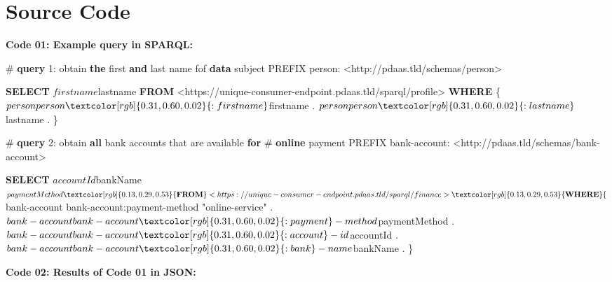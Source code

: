 \documentclass[12pt,english,a4paper,titlepage,cleardoublepage=empty,dottedtoc]{report}
\newenvironment{Shaded}{\begin{snugshade}}{\end{snugshade}}
\newcommand{\KeywordTok}[1]{\textcolor[rgb]{0.13,0.29,0.53}{\textbf{#1}}}
\newcommand{\DecValTok}[1]{\textcolor[rgb]{0.00,0.00,0.81}{#1}}
\newcommand{\CharTok}[1]{\textcolor[rgb]{0.31,0.60,0.02}{#1}}
\newcommand{\OtherTok}[1]{\textcolor[rgb]{0.56,0.35,0.01}{#1}}
\newcommand{\FunctionTok}[1]{\textcolor[rgb]{0.00,0.00,0.00}{#1}}
\newcommand{\NormalTok}[1]{#1}
\begin{document}
\chapter*{Source Code}\label{source-code}

 \setcounter{page}{6} \pagestyle{plain}

\textbf{\protect\hypertarget{code-01_sparql-query}{}{Code 01: Example
query in SPARQL}:}

\begin{Shaded}
\begin{Highlighting}[numbers=left,,]
\NormalTok{# }\KeywordTok{query} \DecValTok{1}\NormalTok{: obtain }\KeywordTok{the} \FunctionTok{first} \KeywordTok{and} \FunctionTok{last}\NormalTok{ name fof }\KeywordTok{data}\NormalTok{ subject}
\NormalTok{PREFIX person: <http://pdaas.tld/schemas/person>}

\KeywordTok{SELECT}\NormalTok{ $firstname $lastname}
\KeywordTok{FROM}\NormalTok{ <https://unique-consumer-endpoint.pdaas.tld/sparql/profile>}
\KeywordTok{WHERE}\NormalTok{ \{}
\NormalTok{    $person person}\CharTok{:firstname}\NormalTok{ $firstname .}
\NormalTok{    $person person}\CharTok{:lastname}\NormalTok{ $lastname .}
\NormalTok{\}}


\NormalTok{# }\KeywordTok{query} \DecValTok{2}\NormalTok{: obtain }\KeywordTok{all}\NormalTok{ bank accounts that are available }\KeywordTok{for} 
\NormalTok{# }\KeywordTok{online}\NormalTok{ payment}
\NormalTok{PREFIX bank-account: <http://pdaas.tld/schemas/bank-account>}

\KeywordTok{SELECT}\NormalTok{ $accountId $bankName $paymentMethod}
\KeywordTok{FROM}\NormalTok{ <https://unique-consumer-endpoint.pdaas.tld/sparql/finance>}
\KeywordTok{WHERE}\NormalTok{ \{}
\NormalTok{    $bank-account bank-account}\CharTok{:payment}\NormalTok{-method }\OtherTok{"online-service"}\NormalTok{ .}
\NormalTok{    $bank-account bank-account}\CharTok{:payment}\NormalTok{-method $paymentMethod .}
\NormalTok{    $bank-account bank-account}\CharTok{:account}\NormalTok{-id $accountId . }
\NormalTok{    $bank-account bank-account}\CharTok{:bank}\NormalTok{-name $bankName .}
\NormalTok{\}}
\end{Highlighting}
\end{Shaded}

\newpage

\textbf{\protect\hypertarget{code-02_sparql-query-results}{}{Code 02:
Results of Code 01 in JSON}:}
\end{document}

